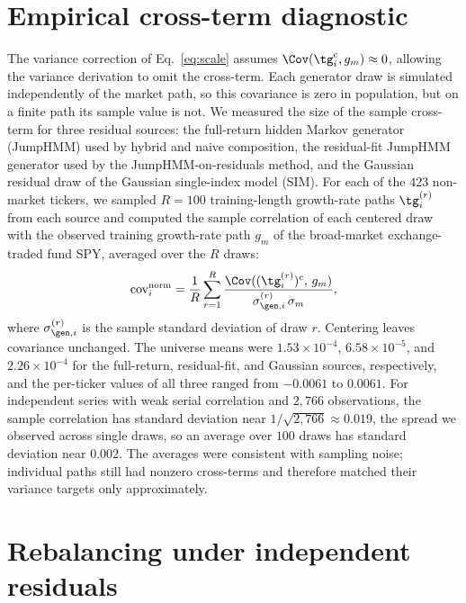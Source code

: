 
\section{Empirical cross-term diagnostic}
\label{sec:supp-cov}

The variance correction of Eq.~\eqref{eq:scale} assumes
$\Cov(\tg_i^{\mathrm c},g_m)\approx0$, allowing the variance derivation to omit
the cross-term. Each generator draw is simulated independently of the
market path, so this covariance is zero in population, but on a
finite path its sample value is not. We measured the size of the
sample cross-term for three residual sources: the full-return
hidden Markov generator (JumpHMM) used by hybrid and naive composition,
the residual-fit JumpHMM generator used by the JumpHMM-on-residuals
method, and the Gaussian residual draw of the Gaussian single-index model (SIM). For each
of the $423$ non-market tickers, we sampled $R = 100$ training-length
growth-rate paths $\tg_i^{(r)}$ from each source and computed the
sample correlation of each centered draw with the observed training
growth-rate path $g_m$ of the broad-market exchange-traded fund SPY,
averaged over the $R$ draws:
\begin{equation}
  \mathrm{cov}^{\mathrm{norm}}_i
  = \frac{1}{R} \sum_{r=1}^{R}
    \frac{\Cov((\tg_i^{(r)})^{\mathrm c},\, g_m)}{\sigma_{\gen,i}^{(r)}\, \sigma_m},
\end{equation}
where $\sigma_{\gen,i}^{(r)}$ is the sample standard deviation of
draw $r$. Centering leaves covariance unchanged. The universe means were
$1.53\times10^{-4}$, $6.58\times10^{-5}$, and $2.26\times10^{-4}$ for
the full-return, residual-fit, and Gaussian sources, respectively,
and the per-ticker values of all three ranged from $-0.0061$ to
$0.0061$. For independent series with weak serial correlation and $2{,}766$
observations, the sample correlation has standard deviation near $1/\sqrt{2{,}766}
\approx 0.019$, the spread we observed across single draws, so an
average over $100$ draws has standard deviation near $0.002$. The averages were consistent with sampling noise; individual paths still had nonzero cross-terms and therefore matched their variance targets only approximately.

\section{Rebalancing under independent residuals}
\label{sec:supp-bias}

